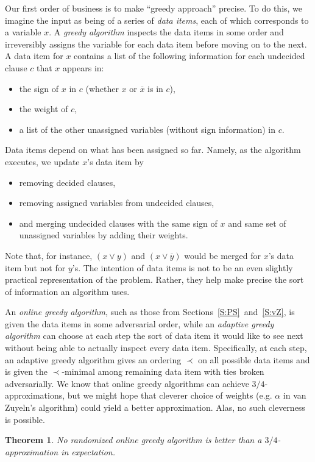\documentclass[11pt,letter]{article}
\newtheorem{theorem}{Theorem}
\numberwithin{theorem}{section}
\newcommand{\ol}{\overline}
\begin{document}
Our first order of business is to make ``greedy approach'' precise.
To do this, we imagine the input as being of a series of \emph{data items},
each of which corresponds to a variable $x$.
A \emph{greedy algorithm} inspects the data items in some order
and irreversibly assigns the variable for each data item
before moving on to the next.
A data item for $x$ contains a list of the following information
for each undecided clause $c$ that $x$ appears in:
\begin{itemize}
\item
  the sign of $x$ in $c$ (whether $x$ or $\ol{x}$ is in $c$),
\item
  the weight of $c$,
\item
  a list of the other unassigned variables (without sign information) in $c$.
\end{itemize}
Data items depend on what has been assigned so far.
Namely, as the algorithm executes, we update $x$'s data item by
\begin{itemize}
\item
  removing decided clauses,
\item
  removing assigned variables from undecided clauses,
\item
  and merging undecided clauses with the same sign of $x$
  and same set of unassigned variables by adding their weights.
\end{itemize}
Note that, for instance, $(x \lor y)$ and $(x \lor \ol{y})$
would be merged for $x$'s data item but not for $y$'s.
The intention of data items is not
to be an even slightly practical representation of the problem.
Rather, they help make precise the sort of information an algorithm uses.

An \emph{online greedy algorithm},
such as those from Sections~\ref{S:PS}~and~\ref{S:vZ},
is given the data items in some adversarial order,
while an \emph{adaptive greedy algorithm}
can choose at each step the sort of data item it would like to see next
without being able to actually inspect every data item.
Specifically, at each step,
an adaptive greedy algorithm
gives an ordering $\prec$ on all possible data items
and is given the $\prec$-minimal among remaining data item
with ties broken adversarially.
We know that online greedy algorithms can achieve $3/4$-approximations,
but we might hope that cleverer choice of weights
(e.g. $\alpha$ in van Zuyeln's algorithm)
could yield a better approximation.
Alas, no such cleverness is possible.

\begin{theorem}\label{theorem:greedyRandomized}
  No randomized online greedy algorithm
  is better than a $3/4$-approximation in expectation.
\end{theorem}
\end{document}
